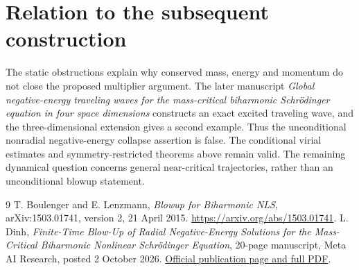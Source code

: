 \documentclass[11pt,a4paper]{article}
\theoremstyle{remark}\newtheorem{remark}[theorem]{Remark}
\begin{document}
\section{Relation to the subsequent construction}
The static obstructions explain why conserved mass, energy and momentum do not close the proposed multiplier argument. The later manuscript \emph{Global negative-energy traveling waves for the mass-critical biharmonic Schr\"odinger equation in four space dimensions} constructs an exact excited traveling wave, and the three-dimensional extension gives a second example. Thus the unconditional nonradial negative-energy collapse assertion is false. The conditional virial estimates and symmetry-restricted theorems above remain valid. The remaining dynamical question concerns general near-critical trajectories, rather than an unconditional blowup statement.

\begin{thebibliography}{9}
 T. Boulenger and E. Lenzmann, \emph{Blowup for Biharmonic NLS}, arXiv:1503.01741, version 2, 21 April 2015. \url{https://arxiv.org/abs/1503.01741}.
 L. Dinh, \emph{Finite-Time Blow-Up of Radial Negative-Energy Solutions for the Mass-Critical Biharmonic Nonlinear Schr\"odinger Equation}, 20-page manuscript, Meta AI Research, posted 2 October 2026. \href{https://ai.meta.com/research/publications/finite-time-blow-up-of-radial-negative-energy-solutions-for-the-mass-critical-biharmonic-nonlinear-schrodinger-equation/}{Official publication page and full PDF}.
\end{thebibliography}
\end{document}

